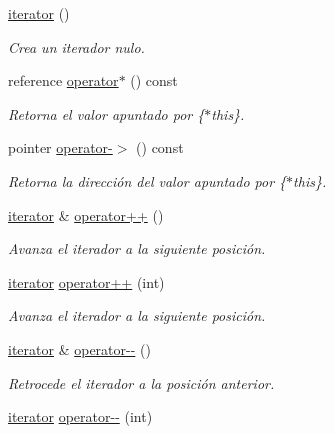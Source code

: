 \begin{DoxyCompactItemize}
\item 
\hyperlink{classaed2_1_1iterator_1_1iterator_ae488782067dfba96b447080b0db1ed2c}{iterator} ()
\begin{DoxyCompactList}\small\item\em \-Crea un iterador nulo. \end{DoxyCompactList}\item 
reference \hyperlink{classaed2_1_1iterator_1_1iterator_abc83982866d43a19f4b43e7ea7660402}{operator$\ast$} () const 
\begin{DoxyCompactList}\small\item\em \-Retorna el valor apuntado por \{$\ast$this\}. \end{DoxyCompactList}\item 
pointer \hyperlink{classaed2_1_1iterator_1_1iterator_a4d20575249803ebf2604c1e58debc5cf}{operator-\/$>$} () const 
\begin{DoxyCompactList}\small\item\em \-Retorna la dirección del valor apuntado por \{$\ast$this\}. \end{DoxyCompactList}\item 
\hyperlink{classaed2_1_1iterator_1_1iterator}{iterator} \& \hyperlink{classaed2_1_1iterator_1_1iterator_a457fdf0ed06c88121b441424f1c99f4f}{operator++} ()
\begin{DoxyCompactList}\small\item\em \-Avanza el iterador a la siguiente posición. \end{DoxyCompactList}\item 
\hyperlink{classaed2_1_1iterator_1_1iterator}{iterator} \hyperlink{classaed2_1_1iterator_1_1iterator_aa2023454f3ce45f7da4ef23d7a7f6749}{operator++} (int)
\begin{DoxyCompactList}\small\item\em \-Avanza el iterador a la siguiente posición. \end{DoxyCompactList}\item 
\hyperlink{classaed2_1_1iterator_1_1iterator}{iterator} \& \hyperlink{classaed2_1_1iterator_1_1iterator_a260692ee1d51f87ef547b4a798fc2de5}{operator-\/-\/} ()
\begin{DoxyCompactList}\small\item\em \-Retrocede el iterador a la posición anterior. \end{DoxyCompactList}\item 
\hyperlink{classaed2_1_1iterator_1_1iterator}{iterator} \hyperlink{classaed2_1_1iterator_1_1iterator_a6bd61026c75767d0d41e45229144e9d0}{operator-\/-\/} (int)

\end{DoxyCompactItemize}

